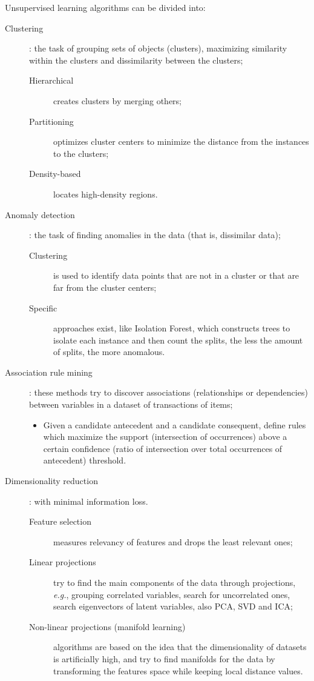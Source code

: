 \documentclass[a4paper]{report}
\begin{document}
Unsupervised learning algorithms can be divided into:
\begin{description}
    \item[Clustering]: the task of grouping sets of objects (clusters), maximizing similarity within the clusters and dissimilarity between the clusters;
	\begin{description}
	    \item[Hierarchical] creates clusters by merging others;
	    \item[Partitioning] optimizes cluster centers to minimize the distance from the instances to the clusters;
	    \item[Density-based] locates high-density regions.
	\end{description}
    \item[Anomaly detection]: the task of finding anomalies in the data (that is, dissimilar data);
	    \begin{description}
	        \item[Clustering] is used to identify data points that are not in a cluster or that are far from the cluster centers;
		\item[Specific] approaches exist, like Isolation Forest, which constructs trees to isolate each instance and then count the splits, the less the amount of splits, the more anomalous.
	    \end{description}
	\item[Association rule mining]: these methods try to discover associations (relationships or dependencies) between variables in a dataset of transactions of items;
	    \begin{itemize}
		\item Given a candidate antecedent and a candidate consequent, define rules which maximize the support (intersection of occurrences) above a certain confidence (ratio of intersection over total occurrences of antecedent) threshold.
	    \end{itemize}
    \item[Dimensionality reduction]: with minimal information loss.
	\begin{description}
	    \item[Feature selection] measures relevancy of features and drops the least relevant ones;
	    \item[Linear projections] try to find the main components of the data through projections, \emph{e.g.}, grouping correlated variables, search for uncorrelated ones, search eigenvectors of latent variables, also PCA, SVD and ICA;
	    \item[Non-linear projections (manifold learning)] algorithms are based on the idea that the dimensionality of datasets is artificially high, and try to find manifolds for the data by transforming the features space while keeping local distance values.
	\end{description}
\end{description}
\end{document}
